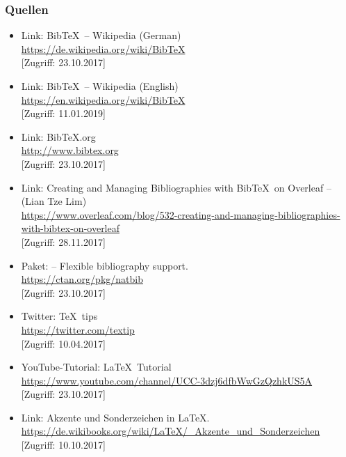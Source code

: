 \documentclass[a4paper,10pt,handout]{beamer}
\begin{document}
\begin{frame}[allowframebreaks]
\frametitle{Quellen}

{\footnotesize
	
	\begin{itemize}
		\item Link: Bib\TeX\ -- Wikipedia (German)\\
		\url{https://de.wikipedia.org/wiki/BibTeX}\\
		{[}Zugriff: 23.10.2017]
		
		\item Link: Bib\TeX\ -- Wikipedia (English)\\
		\url{https://en.wikipedia.org/wiki/BibTeX}\\
		{[}Zugriff: 11.01.2019]
		
		\item Link: Bib\TeX .org\\
		\url{http://www.bibtex.org}\\
		{[}Zugriff: 23.10.2017]
		
		\item Link: Creating and Managing Bibliographies with Bib\TeX\ on Overleaf -- (Lian Tze Lim)\\
		\url{https://www.overleaf.com/blog/532-creating-and-managing-bibliographies-with-bibtex-on-overleaf}\\
		{[}Zugriff: 28.11.2017]
		
		\item Paket:  -- Flexible bibliography support.\\
		\url{https://ctan.org/pkg/natbib}\\
		{[}Zugriff: 23.10.2017]
		
		\item Twitter: \TeX\ tips\\
		\url{https://twitter.com/textip} \\
		{[}Zugriff: 10.04.2017]
		
		\item YouTube-Tutorial: \LaTeX\ Tutorial\\
		\url{https://www.youtube.com/channel/UCC-3dzj6dfbWwGzQzhkUS5A}\\
		{[}Zugriff: 23.10.2017]
		
		\item Link: Akzente und Sonderzeichen in \LaTeX .\\
		\url{https://de.wikibooks.org/wiki/LaTeX/_Akzente_und_Sonderzeichen}\\
		{[}Zugriff: 10.10.2017]


\end{itemize}}
\end{frame}
\end{document}

